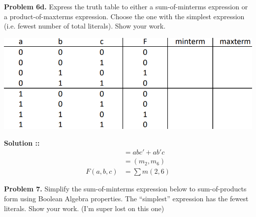 \documentclass[11pt]{article}
\begin{document}
\textbf{Problem 6d.} Express the truth table to either a sum-of-minterms expression
or a product-of-maxterms expression. Choose the one with the simplest expression
(i.e. fewest number of total literals). Show your work.
\begin{center}
    \includegraphics[scale=0.7]{6d.png}
\end{center}
\textbf{Solution ::}
\begin{align*}
    &= abc' + ab'c \\
    &= (m_2, m_6) \\
    F(a, b, c) &= \sum m(2, 6)
\end{align*}

\pagebreak


\textbf{Problem 7.} Simplify the sum-of-minterms expression below to sum-of-products
form using Boolean Algebra properties. The “simplest” expression has the fewest
literals. Show your work. (I'm super lost on this one)
\end{document}
